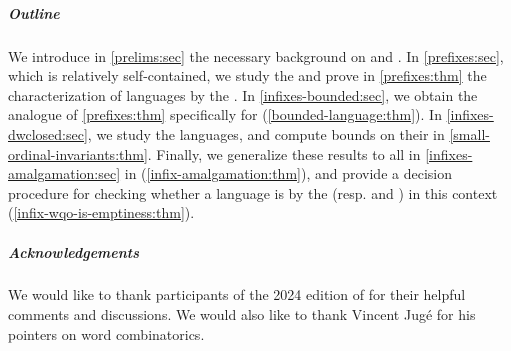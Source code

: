 \subparagraph{Outline} 
We introduce in \cref{prelims:sec} the
necessary background on  and .
In
\cref{prefixes:sec}, which is relatively
self-contained, we study the  and prove in
\cref{prefixes:thm} the characterization of 
languages by the . In
\cref{infixes-bounded:sec}, we
obtain the  analogue of \cref{prefixes:thm}
specifically for 
(\cref{bounded-language:thm}). 
In \cref{infixes-dwclosed:sec}, we study the 
languages, and compute bounds on their  in \cref{small-ordinal-invariants:thm}.
Finally, 
we generalize these results to all
 in \cref{infixes-amalgamation:sec}
in
(\cref{infix-amalgamation:thm}),
and provide a decision procedure for checking whether a language is
 by the  (resp.  and ) in
this context (\cref{infix-wqo-is-emptiness:thm}).

\subparagraph{Acknowledgements} We would like to thank participants of the 2024
edition of  for their helpful comments and discussions.
We would also like to thank Vincent Jugé for his pointers on word combinatorics.
